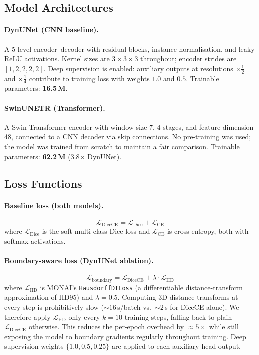 \documentclass[12pt, letterpaper]{article}
\begin{document}
\subsection{Model Architectures}

\paragraph{DynUNet (CNN baseline).}
A 5-level encoder--decoder with residual blocks, instance normalisation, and
leaky ReLU activations.
Kernel sizes are $3\times3\times3$ throughout; encoder strides are
$[1,2,2,2,2]$.
Deep supervision is enabled: auxiliary outputs at resolutions
$\times\frac{1}{2}$ and $\times\frac{1}{4}$ contribute to training loss
with weights $1.0$ and $0.5$.
Trainable parameters: \textbf{16.5\,M}.

\paragraph{SwinUNETR (Transformer).}
A Swin Transformer encoder with window size 7, 4 stages, and feature
dimension 48, connected to a CNN decoder via skip connections.
No pre-training was used; the model was trained from scratch to maintain
a fair comparison.
Trainable parameters: \textbf{62.2\,M} (3.8$\times$ DynUNet).

\subsection{Loss Functions}

\paragraph{Baseline loss (both models).}
\begin{equation}
    \mathcal{L}_{\text{DiceCE}} = \mathcal{L}_{\text{Dice}} + \mathcal{L}_{\text{CE}}
\end{equation}
where $\mathcal{L}_{\text{Dice}}$ is the soft multi-class Dice loss and
$\mathcal{L}_{\text{CE}}$ is cross-entropy, both with softmax activations.

\paragraph{Boundary-aware loss (DynUNet ablation).}
\begin{equation}
    \mathcal{L}_{\text{boundary}} =
        \mathcal{L}_{\text{DiceCE}} + \lambda \cdot \mathcal{L}_{\text{HD}}
\end{equation}
where $\mathcal{L}_{\text{HD}}$ is MONAI's \texttt{HausdorffDTLoss}
(a differentiable distance-transform approximation of HD95) and $\lambda = 0.5$.
Computing 3D distance transforms at every step is prohibitively slow
(${\sim}16$\,s/batch vs.\ ${\sim}2$\,s for DiceCE alone).
We therefore apply $\mathcal{L}_{\text{HD}}$ only every $k=10$ training steps,
falling back to plain $\mathcal{L}_{\text{DiceCE}}$ otherwise.
This reduces the per-epoch overhead by ${\approx}5\times$ while still
exposing the model to boundary gradients regularly throughout training.
Deep supervision weights $\{1.0, 0.5, 0.25\}$ are applied to each auxiliary
head output.
\end{document}
